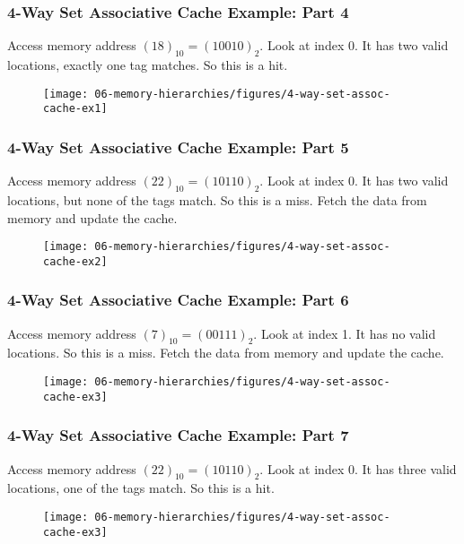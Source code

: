 {\begin{frame}
\end{frame}

\begin{frame}\frametitle{4-Way Set Associative Cache Example: Part 4}
Access memory address $(18)_{10}=(10010)_2$. Look at index 0. It has two valid locations, exactly one tag matches. So this is a hit. 
\begin{figure}[H]
\centering
{\texttt{[image: 06-memory-hierarchies/figures/4-way-set-assoc-cache-ex1]}}
\end{figure}

\end{frame}

\begin{frame}\frametitle{4-Way Set Associative Cache Example: Part 5}
Access memory address $(22)_{10}=(10110)_2$. Look at index 0. It has two valid locations, but none of the tags match. So this is a miss. Fetch the data from memory and update the cache.
\begin{figure}[H]
\centering
{\texttt{[image: 06-memory-hierarchies/figures/4-way-set-assoc-cache-ex2]}}
\end{figure}

\end{frame}

\newpage
\begin{frame}\frametitle{4-Way Set Associative Cache Example: Part 6}
Access memory address $(7)_{10}=(00111)_2$. Look at index 1. It has no valid locations. So this is a miss. Fetch the data from memory and update the cache.
\begin{figure}[H]
\centering
{\texttt{[image: 06-memory-hierarchies/figures/4-way-set-assoc-cache-ex3]}}
\end{figure}

\end{frame}
\begin{frame}\frametitle{4-Way Set Associative Cache Example: Part 7}
Access memory address $(22)_{10}=(10110)_2$. Look at index 0. It has three valid locations, one of the tags match. So this is a hit. 
\begin{figure}[H]
\centering
{\texttt{[image: 06-memory-hierarchies/figures/4-way-set-assoc-cache-ex3]}}
\end{figure}


\end{frame}}
